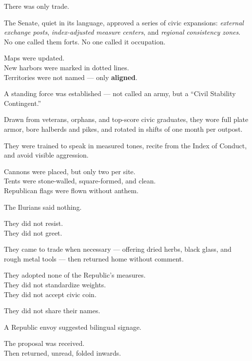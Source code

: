 \documentclass[12pt]{article}
\begin{document}
There was only trade.

The Senate, quiet in its language, approved a series of civic expansions: \textit{external exchange posts}, \textit{index-adjusted measure centers}, and \textit{regional consistency zones}. No one called them forts. No one called it occupation.

Maps were updated.\\
New harbors were marked in dotted lines.\\
Territories were not named — only \textbf{aligned}.

\vspace{1em}

A standing force was established — not called an army, but a ``Civil Stability Contingent.”

Drawn from veterans, orphans, and top-score civic graduates, they wore full plate armor, bore halberds and pikes, and rotated in shifts of one month per outpost.

They were trained to speak in measured tones, recite from the Index of Conduct, and avoid visible aggression.

Cannons were placed, but only two per site.\\
Tents were stone-walled, square-formed, and clean.\\
Republican flags were flown without anthem.

\vspace{1em}

The Ilurians said nothing.

They did not resist.\\
They did not greet.

They came to trade when necessary — offering dried herbs, black glass, and rough metal tools — then returned home without comment.

They adopted none of the Republic’s measures.\\
They did not standardize weights.\\
They did not accept civic coin.

They did not share their names.

\vspace{1em}

A Republic envoy suggested bilingual signage.

The proposal was received.\\
Then returned, unread, folded inwards.

\vspace{1em}
\end{document}
